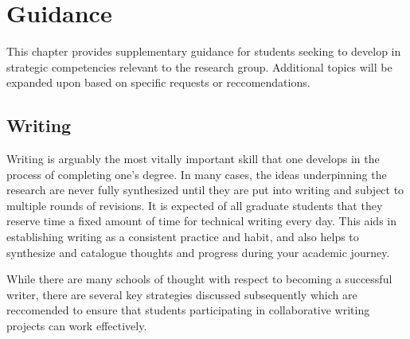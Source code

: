 \documentclass[12pt,a4paper,article,oneside]{memoir} %
\begin{document}

\newpage

\chapter{Guidance} \label{sec:guidance}

This chapter provides supplementary guidance for students seeking to develop in strategic competencies relevant to the research group. Additional topics will be expanded upon based on specific requests or reccomendations.





\section{Writing}

Writing is arguably the most vitally important skill that one develops in the process of completing one's degree. In many cases, the ideas underpinning the research are never fully synthesized until they are put into writing and subject to multiple rounds of revisions. It is expected of all graduate students that they reserve time a fixed amount of time for technical writing every day. This aids in establishing writing as a consistent practice and habit, and also helps to synthesize and catalogue thoughts and progress during your academic journey.

While there are many schools of thought with respect to becoming a successful writer, there are several key strategies discussed subsequently which are reccomended to ensure that students participating in collaborative writing projects can work effectively.
\end{document}
